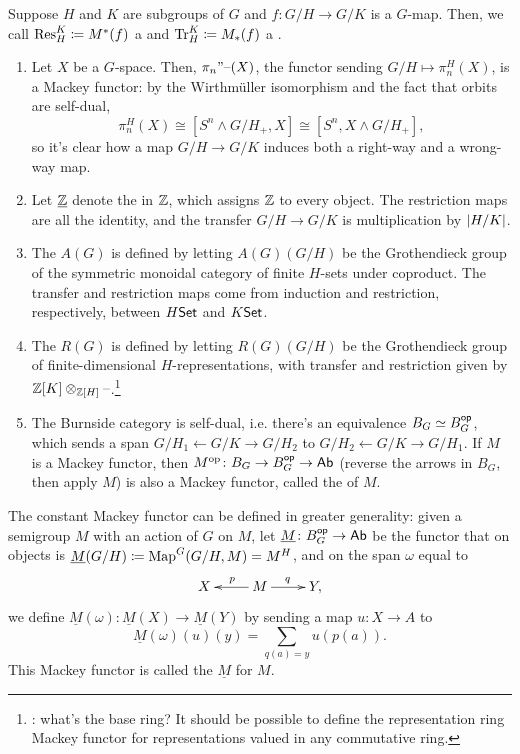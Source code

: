 Suppose $H$ and $K$ are subgroups of $G$ and $f\colon G/H\to G/K$ is a $G$-map. Then, we call $\operatorname{Res}_H^K\coloneqq
M^*(f)$ a  and $\operatorname{Tr}_H^K\coloneqq M_*(f)$ a
.
\begin{exm}\hfill
\label{Mackeyexm}
\begin{enumerate}
	\item Let $X$ be a $G$-space. Then, $\pi_n"\text{--}(X)$, the functor sending $G/H\mapsto\pi_n^H(X)$, is a Mackey
	functor: by the Wirthmüller isomorphism and the fact that orbits are self-dual,
	\[\pi_n^H(X)\cong [S^n\wedge G/H_+, X]\cong [S^n, X\wedge G/H_+],\]
	so it's clear how a map $G/H\to G/K$ induces both a right-way and a wrong-way map.
	\item Let $\underline{\mathbb Z}$ denote the  in $\mathbb Z$, which assigns $\mathbb Z$ to every object.
	The restriction maps are all the identity, and the transfer $G/H\to G/K$ is multiplication by $\lvert H/K\rvert$.
	\item The  $A(G)$ is defined by letting $A(G)(G/H)$ be the Grothendieck group of
	the symmetric monoidal category of finite $H$-sets under coproduct. The transfer and restriction maps come from
	induction and restriction, respectively, between $H\mathsf{Set}$ and $K\mathsf{Set}$.
	\item The  $R(G)$ is defined by letting $R(G)(G/H)$ be the Grothendieck
	group of finite-dimensional $H$-representations, with transfer and restriction given by
	$\mathbb Z[K]\otimes_{\mathbb Z[H]}\text{--}$.\footnote{\TODO: what's the base ring? It should be possible to define the
	representation ring Mackey functor for representations valued in any commutative ring.}
	\item The Burnside category is self-dual, i.e. there's an equivalence $B_G\simeq B_G^{\mathsf{op}}$, which sends a span
	$G/H_1\gets G/K\to G/H_2$ to $G/H_2\gets G/K\to G/H_1$. If $M$ is a Mackey functor, then $M^{\mathrm{op}}\colon B_G\to
	B_G^{\mathsf{op}}\to\mathsf{Ab}$ (reverse the arrows in $B_G$, then apply $M$) is also a Mackey functor, called the
	 of $M$.
	\qedhere
\end{enumerate}
\end{exm}
\begin{exm}
The constant Mackey functor can be defined in greater generality: given a semigroup $M$ with an action of $G$ on
$M$, let $\underline M\colon B_G^{\mathsf{op}}\to\mathsf{Ab}$ be the functor that on objects is $\underline M(G/H)\coloneqq
\operatorname{Map}^G(G/H,M) = M^H$, and on the span $\omega$ equal to
	\[\xymatrix{
		X & M\ar[l]_p\ar[r]^q & Y,
	}\]
we define $\underline M(\omega)\colon \underline M(X) \to \underline M(Y)$ by sending a map $u\colon X \to A$ to
\[\underline M(\omega)(u)(y) = \sum_{q(a) = y} u(p(a)).\]
This Mackey functor is called the 
$\underline M$ for $M$.
\end{exm}
